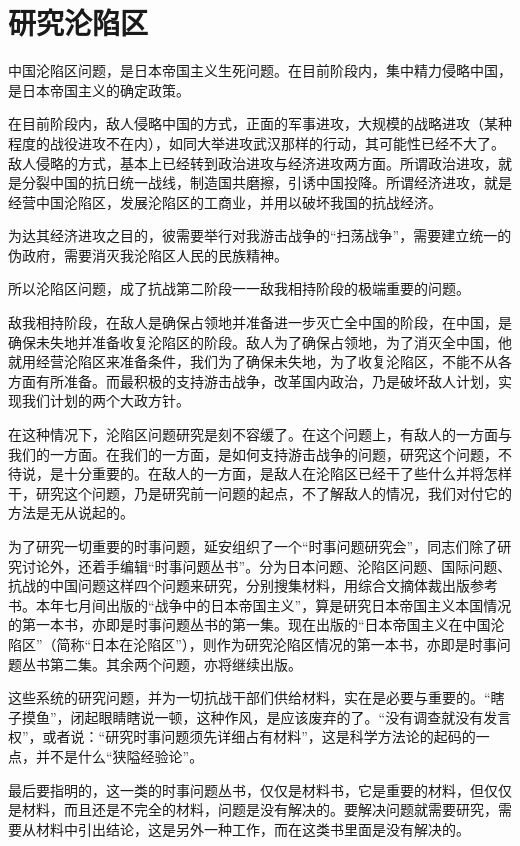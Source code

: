 \section[研究沦陷区（一九三九年十月一日）]{研究沦陷区}


中国沦陷区问题，是日本帝国主义生死问题。在目前阶段内，集中精力侵略中国，是日本帝国主义的确定政策。

在目前阶段内，敌人侵略中国的方式，正面的军事进攻，大规模的战略进攻（某种程度的战役进攻不在内），如同大举进攻武汉那样的行动，其可能性已经不大了。敌人侵略的方式，基本上已经转到政治进攻与经济进攻两方面。所谓政治进攻，就是分裂中国的抗日统一战线，制造国共磨擦，引诱中国投降。所谓经济进攻，就是经营中国沦陷区，发展沦陷区的工商业，并用以破坏我国的抗战经济。

为达其经济进攻之目的，彼需要举行对我游击战争的“扫荡战争”，需要建立统一的伪政府，需要消灭我沦陷区人民的民族精神。

所以沦陷区问题，成了抗战第二阶段一一敌我相持阶段的极端重要的问题。

敌我相持阶段，在敌人是确保占领地并准备进一步灭亡全中国的阶段，在中国，是确保未失地并准备收复沦陷区的阶段。敌人为了确保占领地，为了消灭全中国，他就用经营沦陷区来准备条件，我们为了确保未失地，为了收复沦陷区，不能不从各方面有所准备。而最积极的支持游击战争，改革国内政治，乃是破坏敌人计划，实现我们计划的两个大政方针。

在这种情况下，沦陷区问题研究是刻不容缓了。在这个问题上，有敌人的一方面与我们的一方面。在我们的一方面，是如何支持游击战争的问题，研究这个问题，不待说，是十分重要的。在敌人的一方面，是敌人在沦陷区已经干了些什么并将怎样干，研究这个问题，乃是研究前一问题的起点，不了解敌人的情况，我们对付它的方法是无从说起的。

为了研究一切重要的时事问题，延安组织了一个“时事问题研究会”，同志们除了研究讨论外，还着手编辑“时事问题丛书”。分为日本问题、沦陷区问题、国际问题、抗战的中国问题这样四个问题来研究，分别搜集材料，用综合文摘体裁出版参考书。本年七月间出版的“战争中的日本帝国主义”，算是研究日本帝国主义本国情况的第一本书，亦即是时事问题丛书的第一集。现在出版的“日本帝国主义在中国沦陷区”（简称“日本在沦陷区”），则作为研究沦陷区情况的第一本书，亦即是时事问题丛书第二集。其余两个问题，亦将继续出版。

这些系统的研究问题，并为一切抗战干部们供给材料，实在是必要与重要的。“瞎子摸鱼”，闭起眼睛瞎说一顿，这种作风，是应该废弃的了。“没有调查就没有发言权”，或者说：“研究时事问题须先详细占有材料”，这是科学方法论的起码的一点，并不是什么“狭隘经验论”。

最后要指明的，这一类的时事问题丛书，仅仅是材料书，它是重要的材料，但仅仅是材料，而且还是不完全的材料，问题是没有解决的。要解决问题就需要研究，需要从材料中引出结论，这是另外一种工作，而在这类书里面是没有解决的。

